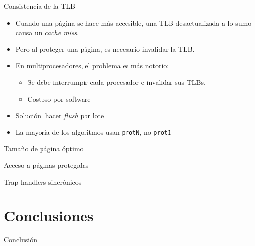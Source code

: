 \documentclass[xcolor=pdftex,dvipsnames,usenames,table]{beamer}
\begin{document}
\begin{frame}{Consistencia de la TLB}
  \begin{itemize}
    \item Cuando una página se hace más accesible, una TLB desactualizada a lo
          sumo causa un \textit{cache miss}.
    \item Pero al proteger una página, es necesario invalidar la TLB.
    \item En multiprocesadores, el problema es más notorio:
    \begin{itemize}
      \item Se debe interrumpir cada procesador e invalidar sus TLBs.
      \item Costoso por software
    \end{itemize}
    \item Solución: hacer \textit{flush} por lote
    \item La mayoria de los algoritmos usan \texttt{protN}, no \texttt{prot1}
  \end{itemize}
\end{frame}

\begin{frame}{Tamaño de página óptimo}
\end{frame}

\begin{frame}{Acceso a páginas protegidas}
\end{frame}

\begin{frame}{Trap handlers sincrónicos}
\end{frame}

\section{Conclusiones}

\begin{frame}{Conclusión}
\end{frame}
\end{document}
